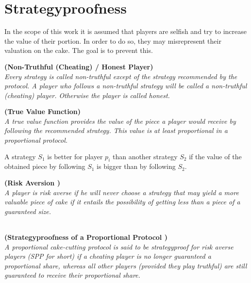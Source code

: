 \section{Strategyproofness}
\label{sven_hat_recht}
In the scope of this work it is assumed that players are selfish and try to increase the value of their portion. In order to do so, they may misrepresent their valuation on the cake. The goal is to prevent this.
\begin{defi}{\textbf{(Non-Truthful (Cheating) / Honest Player)}}\\
\emph{Every strategy is called \emph{non-truthful} except of the strategy recommended by the protocol. A player who follows a non-truthful strategy will be called a \emph{non-truthful (cheating) player}. Otherwise the player is called \emph{honest}.}
\end{defi}
\begin{defi}{\textbf{(True Value Function)}}\\
\emph{A \emph{true value function} provides the value of the piece a player would receive by following the recommended strategy. This value is at least proportional in a proportional protocol.}
\end{defi}
A strategy $S_{1}$ is better for player $p_{i}$ than another strategy $S_{2}$ if the value of the obtained piece by following $S_{1}$ is bigger than by following $S_{2}$.
\begin{defi}{\textbf{(Risk Aversion \cite{brams})}}\\
\emph{A player is \emph{risk averse} if he will never choose a strategy that may yield a more valuable piece of cake if it entails the possibility of getting less than a piece of a guaranteed size.}
\end{defi}
\begin{defi}{\textbf{\\(Strategyproofness of a Proportional Protocol \cite{lindner:degrees})}}\\
\emph{A proportional cake-cutting protocol is said to be \emph{strategyproof for risk averse players} (SPP for short) if a cheating player is no longer guaranteed a proportional share, whereas all other players (provided they play truthful) are still guaranteed to receive their proportional share.}
\end{defi}

